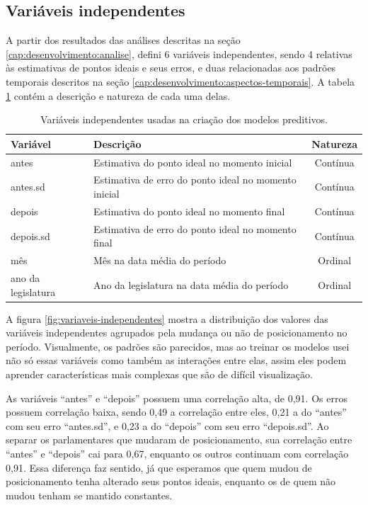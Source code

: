 \documentclass[a4paper,titlepage]{ppgi}\usepackage[]{graphicx}\usepackage[]{color}
\begin{document}
\subsection{Variáveis independentes}
\label{cap:desenvolvimento:variaveis-independentes}

A partir dos resultados das análises descritas na seção
\ref{cap:desenvolvimento:analise}, defini 6 variáveis independentes, sendo 4 relativas
às estimativas de pontos ideais e seus erros, e duas relacionadas aos padrões
temporais descritos na seção \ref{cap:desenvolvimento:aspectos-temporais}. A tabela
\ref{table:variaveis-independentes} contém a descrição e natureza de cada uma
delas.

\begin{table}
\centering
\begin{tabular}{l l c}
  Variável & Descrição & Natureza \\
  \hline
  antes & Estimativa do ponto ideal no momento inicial & Contínua \\
  antes.sd & Estimativa de erro do ponto ideal no momento inicial& Contínua \\
  depois & Estimativa do ponto ideal no momento final & Contínua \\
  depois.sd & Estimativa de erro do ponto ideal no momento final & Contínua \\
  mês & Mês na data média do período & Ordinal \\
  ano da legislatura & Ano da legislatura na data média do período & Ordinal \\
\end{tabular}
\caption{Variáveis independentes usadas na criação dos modelos preditivos.}
\label{table:variaveis-independentes}
\end{table}

A figura \ref{fig:variaveis-independentes} mostra a distribuição dos valores das
variáveis independentes agrupados pela mudança ou não de posicionamento no
período. Visualmente, os padrões são parecidos, mas ao treinar os modelos usei
não só essas variáveis como também as interações entre elas, assim eles podem
aprender características mais complexas que são de difícil visualização.

As variáveis ``antes'' e ``depois'' possuem uma correlação alta, de
0,91. Os erros possuem correlação baixa, sendo
0,49 a correlação entre eles,
0,21 a do ``antes'' com seu erro
``antes.sd'', e 0,23 a do ``depois'' com seu
erro ``depois.sd''. Ao separar os parlamentares que mudaram de posicionamento,
sua correlação entre ``antes'' e ``depois'' cai para
0,67, enquanto os outros continuam com
correlação 0,91. Essa diferença faz sentido, já
que esperamos que quem mudou de posicionamento tenha alterado seus pontos
ideais, enquanto os de quem não mudou tenham se mantido constantes.
\end{document}
